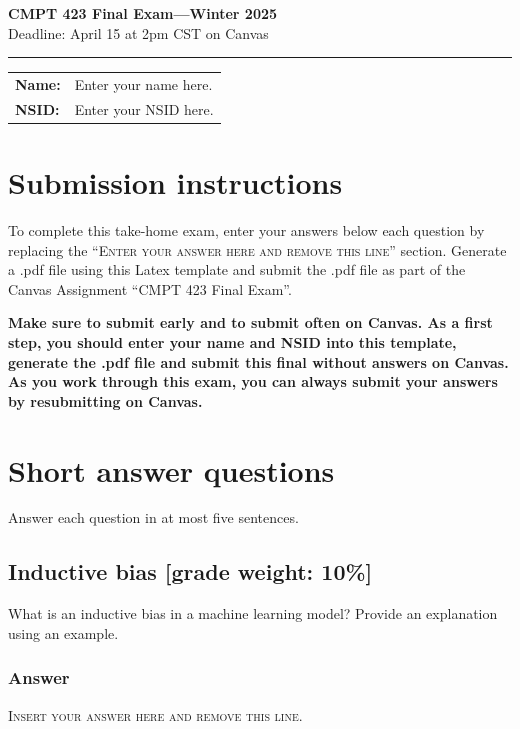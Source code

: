\documentclass{article}
\begin{document}
\begin{centering}
\Large\textbf{{\sc CMPT 423 Final Exam---Winter 2025}}\\[1ex]
\large{{Deadline: April 15 at 2pm CST on Canvas}}\\
\end{centering}
\hrule

\bigskip

\begin{tabular}{lp{5in}}
\textbf{Name:} & Enter your name here. \\
\textbf{NSID:} & Enter your NSID here. \\
\end{tabular}

\section*{Submission instructions}
To complete this take-home exam, enter your answers below each question by replacing the ``\textsc{Enter your answer here and remove this line}'' section. 
Generate a .pdf file using this Latex template and submit the .pdf file as part of the Canvas Assignment ``CMPT 423 Final Exam''.

\bigskip

\noindent \textbf{Make sure to submit early and to submit often on Canvas.
As a first step, you should enter your name and NSID into this template, generate the .pdf file and submit this final without answers on Canvas.
As you work through this exam, you can always submit your answers by resubmitting on Canvas.
}

\newpage

\section{Short answer questions}

Answer each question in at most five sentences.

\subsection{Inductive bias [grade weight: 10\%]}
What is an inductive bias in a machine learning model?
Provide an explanation using an example.

\subsubsection*{Answer}
\noindent\textsc{Insert your answer here and remove this line.}
\end{document}
